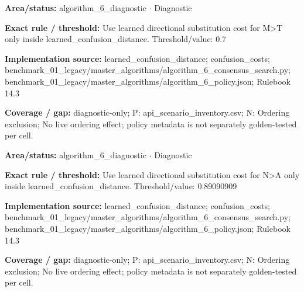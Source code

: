 \begin{tcolorbox}[enhanced,breakable,colback=white,colframe=Muted!45,boxrule=0.45pt,arc=1.5pt,left=6pt,right=6pt,top=5pt,bottom=5pt,title={\texttt{A6-LEARNED-SUBSTITUTION-M-T}},title after break={\texttt{A6-LEARNED-SUBSTITUTION-M-T}\ (continued)},fonttitle=\headingfont\bfseries\color{Navy},coltitle=Navy]
\textbf{Area/status:} algorithm\_\allowbreak{}6\_\allowbreak{}diagnostic $\boldsymbol{\cdot}$ Diagnostic\par
\smallskip
\textbf{Exact rule / threshold:} Use learned directional substitution cost for M>T only inside learned\_\allowbreak{}confusion\_\allowbreak{}distance. Threshold/\allowbreak{}value: 0.7\par
\smallskip
\textbf{Implementation source:} learned\_\allowbreak{}confusion\_\allowbreak{}distance; confusion\_\allowbreak{}costs; benchmark\_\allowbreak{}01\_\allowbreak{}legacy/\allowbreak{}master\_\allowbreak{}algorithms/\allowbreak{}algorithm\_\allowbreak{}6\_\allowbreak{}consensus\_\allowbreak{}search.py; benchmark\_\allowbreak{}01\_\allowbreak{}legacy/\allowbreak{}master\_\allowbreak{}algorithms/\allowbreak{}algorithm\_\allowbreak{}6\_\allowbreak{}policy.json; Rulebook 14.3\par
\smallskip
\textbf{Coverage / gap:} diagnostic-only; P: api\_\allowbreak{}scenario\_\allowbreak{}inventory.csv; N: Ordering exclusion; No live ordering effect; policy metadata is not separately golden-tested per cell.
\end{tcolorbox}
\begin{tcolorbox}[enhanced,breakable,colback=white,colframe=Muted!45,boxrule=0.45pt,arc=1.5pt,left=6pt,right=6pt,top=5pt,bottom=5pt,title={\texttt{A6-LEARNED-SUBSTITUTION-N-A}},title after break={\texttt{A6-LEARNED-SUBSTITUTION-N-A}\ (continued)},fonttitle=\headingfont\bfseries\color{Navy},coltitle=Navy]
\textbf{Area/status:} algorithm\_\allowbreak{}6\_\allowbreak{}diagnostic $\boldsymbol{\cdot}$ Diagnostic\par
\smallskip
\textbf{Exact rule / threshold:} Use learned directional substitution cost for N>A only inside learned\_\allowbreak{}confusion\_\allowbreak{}distance. Threshold/\allowbreak{}value: 0.89090909\par
\smallskip
\textbf{Implementation source:} learned\_\allowbreak{}confusion\_\allowbreak{}distance; confusion\_\allowbreak{}costs; benchmark\_\allowbreak{}01\_\allowbreak{}legacy/\allowbreak{}master\_\allowbreak{}algorithms/\allowbreak{}algorithm\_\allowbreak{}6\_\allowbreak{}consensus\_\allowbreak{}search.py; benchmark\_\allowbreak{}01\_\allowbreak{}legacy/\allowbreak{}master\_\allowbreak{}algorithms/\allowbreak{}algorithm\_\allowbreak{}6\_\allowbreak{}policy.json; Rulebook 14.3\par
\smallskip
\textbf{Coverage / gap:} diagnostic-only; P: api\_\allowbreak{}scenario\_\allowbreak{}inventory.csv; N: Ordering exclusion; No live ordering effect; policy metadata is not separately golden-tested per cell.
\end{tcolorbox}
